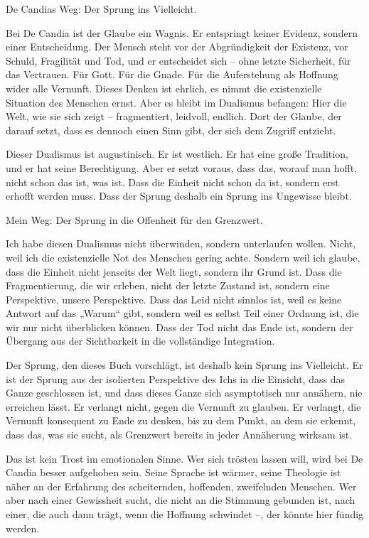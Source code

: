 \documentclass[
  ngerman,
]{article}
\begin{document}
De Candias Weg: Der Sprung ins Vielleicht.

Bei De Candia ist der Glaube ein Wagnis. Er entspringt keiner Evidenz,
sondern einer Entscheidung. Der Mensch steht vor der Abgründigkeit der
Existenz, vor Schuld, Fragilität und Tod, und er entscheidet sich --
ohne letzte Sicherheit, für das Vertrauen. Für Gott. Für die Gnade.
Für die Auferstehung als Hoffnung wider alle Vernunft. Dieses Denken ist
ehrlich, es nimmt die existenzielle Situation des Menschen ernst. Aber
es bleibt im Dualismus befangen: Hier die Welt, wie sie sich zeigt --
fragmentiert, leidvoll, endlich. Dort der Glaube, der darauf setzt, dass
es dennoch einen Sinn gibt, der sich dem Zugriff entzieht.

Dieser Dualismus ist augustinisch. Er ist westlich. Er hat eine große
Tradition, und er hat seine Berechtigung. Aber er setzt voraus, dass
das, worauf man hofft, nicht schon das ist, was ist. Dass die Einheit
nicht schon da ist, sondern erst erhofft werden muss. Dass der Sprung
deshalb ein Sprung ins Ungewisse bleibt.

Mein Weg: Der Sprung in die Offenheit für den Grenzwert.

Ich habe diesen Dualismus nicht überwinden, sondern unterlaufen wollen.
Nicht, weil ich die existenzielle Not des Menschen gering achte. Sondern
weil ich glaube, dass die Einheit nicht jenseits der Welt liegt, sondern
ihr Grund ist. Dass die Fragmentierung, die wir erleben, nicht der
letzte Zustand ist, sondern eine Perspektive, unsere Perspektive. Dass
das Leid nicht sinnlos ist, weil es keine Antwort auf das „Warum`` gibt,
sondern weil es selbst Teil einer Ordnung ist, die wir nur nicht
überblicken können. Dass der Tod nicht das Ende ist, sondern der
Übergang aus der Sichtbarkeit in die vollständige Integration.

Der Sprung, den dieses Buch vorschlägt, ist deshalb kein Sprung ins
Vielleicht. Er ist der Sprung aus der isolierten Perspektive des Ichs in
die Einsicht, dass das Ganze geschlossen ist, und dass dieses Ganze
sich asymptotisch nur annähern, nie erreichen lässt. Er verlangt nicht,
gegen die Vernunft zu glauben. Er verlangt, die Vernunft konsequent zu
Ende zu denken, bis zu dem Punkt, an dem sie erkennt, dass das, was
sie sucht, als Grenzwert bereits in jeder Annäherung wirksam ist.

Das ist kein Trost im emotionalen Sinne. Wer sich trösten lassen will,
wird bei De Candia besser aufgehoben sein. Seine Sprache ist wärmer,
seine Theologie ist näher an der Erfahrung des scheiternden, hoffenden,
zweifelnden Menschen. Wer aber nach einer Gewissheit sucht, die nicht an
die Stimmung gebunden ist, nach einer, die auch dann trägt, wenn die
Hoffnung schwindet --, der könnte hier fündig werden.
\end{document}
